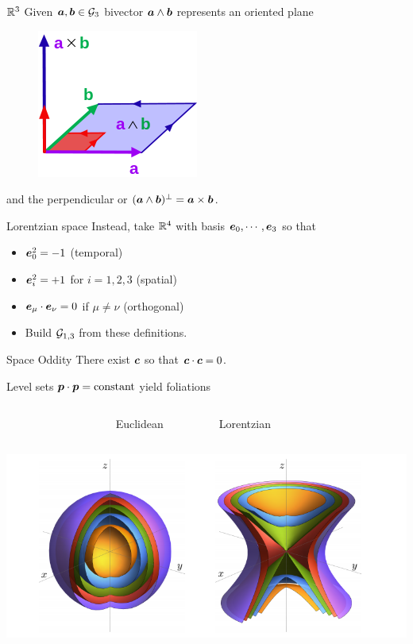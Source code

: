 \documentclass[aspectratio=169]{beamer}
\begin{document}
\begin{frame}{$\mathbb{R}^3$}
\vfill
Given $\boldsymbol{a},\boldsymbol{b}\in \mathcal{G}_3$ bivector $\boldsymbol{a}\wedge \boldsymbol{b}$ represents an oriented plane
	\begin{figure}[H]
		\includegraphics[width=.3\textwidth]{figures/bivector.png}
	\end{figure}
and the perpendicular or  $(\boldsymbol{a}\wedge \boldsymbol{b})^\perp = \boldsymbol{a}\times \boldsymbol{b}$.
\vfill
\end{frame}

\begin{frame}{Lorentzian space}
\vfill
Instead, take $\mathbb{R}^4$ with basis $\boldsymbol{e}_0,\cdots,\boldsymbol{e}_3$ so that
\begin{itemize}
	\item $\boldsymbol{e}_0^2 = -1$ (temporal)
	\item $\boldsymbol{e}_i^2 = +1$ for $i=1,2,3$ (spatial)
	\item $\boldsymbol{e}_\mu \cdot \boldsymbol{e}_\nu = 0$ if $\mu \neq \nu$ (orthogonal)
	\item Build $\mathcal{G}_{1,3}$ from these definitions.
\end{itemize}
\vfill
\end{frame}

\begin{frame}{Space Oddity}
\vfill
\center
There exist  $\boldsymbol{c}$ so that $\boldsymbol{c}\cdot \boldsymbol{c} = 0$.
\vfill
\end{frame}

\begin{frame}{}
\vfill
\centering Level sets $\boldsymbol{p}\cdot \boldsymbol{p} = \textrm{constant}$ yield foliations
\vspace*{.5cm}
\begin{columns}[c]
~~~~~~~~~~~~~~~~~~~ Euclidean 

~~~~~~~Lorentzian
\end{columns}
\begin{center}
    \includegraphics[scale=.5]{figures/foliations2.png}
\end{center}
\vfill   
\end{frame}
\end{document}
